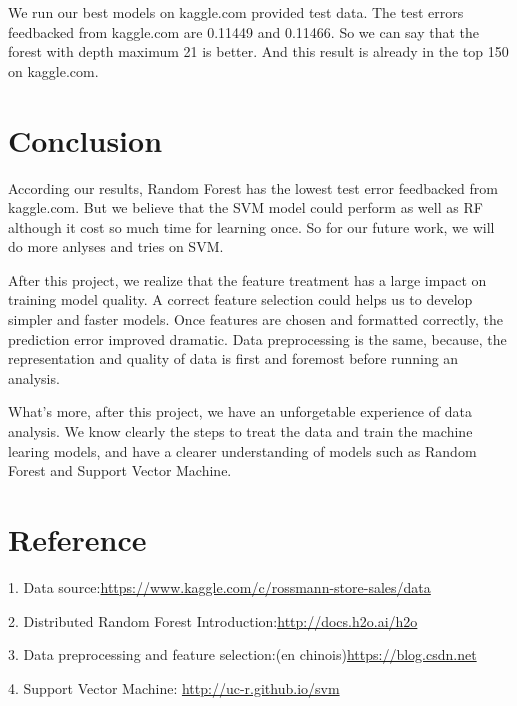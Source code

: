 \documentclass[12pt]{article}
\begin{document}
	We run our best models on kaggle.com provided test data. The test errors feedbacked	from kaggle.com are 0.11449 and 0.11466. So we can say that the forest with depth maximum 21 is better. And this result is already in the top 150 on kaggle.com. 
\newpage
\section{\textbf{Conclusion}}

According our results,  Random Forest has the lowest test error feedbacked from kaggle.com. But we believe that the SVM model could perform as well as RF although it cost so much time for learning once. So for our future work, we will do more anlyses and tries on SVM.

After this project, we realize that the feature treatment has a large impact on training model quality. A correct feature selection could helps us to develop simpler and faster models. Once features are chosen and formatted correctly, the prediction error improved dramatic. Data preprocessing is the same, because, the representation and quality of data is first and foremost before running an analysis. 

What's more, after this project, we have an unforgetable experience of data analysis. We know clearly the steps to treat the data and train the machine learing models, and have a clearer understanding of models such as Random Forest and Support Vector Machine.

\section{\textbf{Reference}}

1. Data source:\href{https://www.kaggle.com/c/rossmann-store-sales/data}{https://www.kaggle.com/c/rossmann-store-sales/data}

2. Distributed Random Forest Introduction:\href{http://docs.h2o.ai/h2o/latest-stable/h2o-docs/data-science/drf.html}{http://docs.h2o.ai/h2o}

3. Data preprocessing and feature selection:(en chinois)\href{https://blog.csdn.net/u010089444/article/details/70053104}{https://blog.csdn.net}

4. Support Vector Machine: \href{http://uc-r.github.io/svm}{http://uc-r.github.io/svm}
\end{document}
